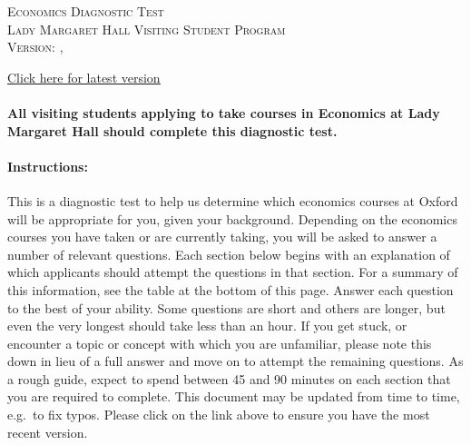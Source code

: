 \documentclass[addpoints,12pt]{exam}
\begin{document}
\begin{center}

  \textsc{\Large Economics Diagnostic Test \\ \normalsize Lady Margaret Hall Visiting Student Program \\ \vspace{0.5em} Version: \DTMtoday, \DTMcurrenttime}

  \vspace{1em}

  \href{https://raw.githubusercontent.com/fditraglia/lmh-econ-diagnostic/main/lmh-econ-diagnostic.pdf}{\underline{Click here for latest version}}

\vspace{5em}



\end{center}

\vspace{2em}

\paragraph{All visiting students applying to take courses in Economics at Lady Margaret Hall should complete this diagnostic test.}

\vspace{2em}

\paragraph{Instructions:} This is a diagnostic test to help us determine which economics courses at Oxford will be appropriate for you, given your background. Depending on the economics courses you have taken or are currently taking, you will be asked to answer a number of relevant questions. Each section below begins with an explanation of which applicants should attempt the questions in that section. For a summary of this information, see the table at the bottom of this page. Answer each question to the best of your ability. Some questions are short and others are longer, but even the very longest should take less than an hour. If you get stuck, or encounter a topic or concept with which you are unfamiliar, please note this down in lieu of a full answer and move on to attempt the remaining questions. As a rough guide, expect to spend between 45 and 90 minutes on each section that you are required to complete. This document may be updated from time to time, e.g.\ to fix typos. Please click on the link above to ensure you have the most recent version.
\end{document}
